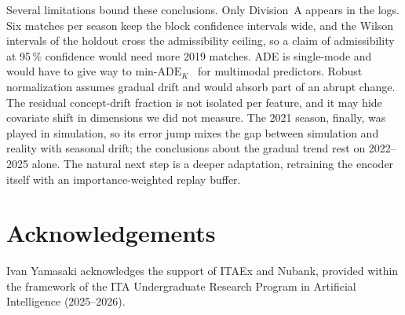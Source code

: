 \documentclass[runningheads]{llncs}
\begin{document}
Several limitations bound these conclusions. Only Division~A appears in the
logs. Six matches per season keep the block confidence intervals wide, and the
Wilson intervals of the holdout cross the admissibility ceiling, so a claim of
admissibility at 95\,\% confidence would need more 2019 matches. ADE is
single-mode and would have to give way to
$\text{min-ADE}_K$~\cite{salzmann2020,yuan2021} for multimodal predictors.
Robust normalization assumes gradual drift and would absorb part of an abrupt
change. The residual concept-drift fraction is not isolated per feature, and it
may hide covariate shift in dimensions we did not measure. The 2021 season,
finally, was played in simulation, so its error jump mixes the gap between
simulation and reality with seasonal drift; the conclusions about the gradual
trend rest on 2022--2025 alone. The natural next step is a deeper adaptation,
retraining the encoder itself with an importance-weighted replay buffer.

\section*{Acknowledgements}
Ivan Yamasaki acknowledges the support of ITAEx and Nubank, provided within the framework of the ITA Undergraduate Research Program in Artificial Intelligence (2025--2026).
\end{document}
